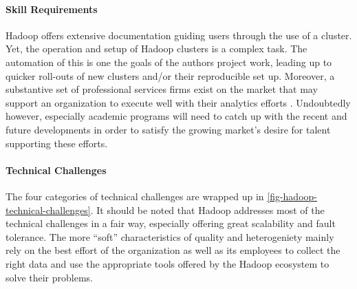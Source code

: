 \paragraph{Skill Requirements}
Hadoop offers extensive documentation guiding users through the use of a cluster. Yet, the operation and setup of Hadoop clusters is a complex task. The automation of this is one the goals of the authors project work, leading up to quicker roll-outs of new clusters and/or their reproducible set up. Moreover, a substantive set of professional services firms exist on the market that may support an organization to execute well with their analytics efforts \autocite{hadoopconsulting}. Undoubtedly however, especially academic programs will need to catch up with the recent and future developments in order to satisfy the growing market's desire for talent supporting these efforts.

\paragraph{Technical Challenges}
The four categories of technical challenges are wrapped up in \autoref{fig-hadoop-technical-challenges}. It should be noted that Hadoop addresses most of the technical challenges in a fair way, especially offering great scalability and fault tolerance. The more \enquote{soft} characteristics of quality and heterogeniety mainly rely on the best effort of the organization as well as its employees to collect the right data and use the appropriate tools offered by the Hadoop ecosystem to solve their problems.

